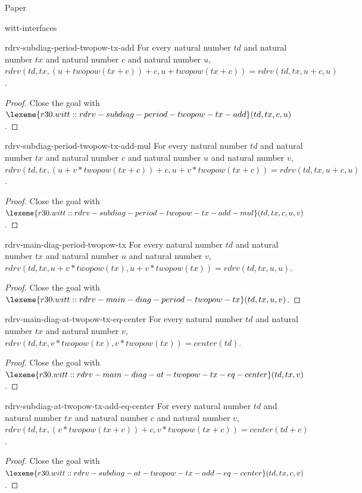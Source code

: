 \begin{lexlean}{Paper}
\begin{section}{witt-interfaces}
  \begin{theorem}{rdrv-subdiag-period-twopow-tx-add}
  For every natural number \(td\) and natural number \(tx\) and natural number \(c\) and natural number \(u\), \(rdrv(td, tx, (u + twopow(tx + c)) + c, u + twopow(tx + c)) = rdrv(td, tx, u + c, u)\).
  \begin{proof}
  Close the goal with \(\lexeme{r30.witt::rdrv-subdiag-period-twopow-tx-add}(td, tx, c, u)\).
  \end{proof}
  \end{theorem}

  \begin{theorem}{rdrv-subdiag-period-twopow-tx-add-mul}
  For every natural number \(td\) and natural number \(tx\) and natural number \(c\) and natural number \(u\) and natural number \(v\), \(rdrv(td, tx, (u + v * twopow(tx + c)) + c, u + v * twopow(tx + c)) = rdrv(td, tx, u + c, u)\).
  \begin{proof}
  Close the goal with \(\lexeme{r30.witt::rdrv-subdiag-period-twopow-tx-add-mul}(td, tx, c, u, v)\).
  \end{proof}
  \end{theorem}

  \begin{theorem}{rdrv-main-diag-period-twopow-tx}
  For every natural number \(td\) and natural number \(tx\) and natural number \(u\) and natural number \(v\), \(rdrv(td, tx, u + v * twopow(tx), u + v * twopow(tx)) = rdrv(td, tx, u, u)\).
  \begin{proof}
  Close the goal with \(\lexeme{r30.witt::rdrv-main-diag-period-twopow-tx}(td, tx, u, v)\).
  \end{proof}
  \end{theorem}

  \begin{theorem}{rdrv-main-diag-at-twopow-tx-eq-center}
  For every natural number \(td\) and natural number \(tx\) and natural number \(v\), \(rdrv(td, tx, v * twopow(tx), v * twopow(tx)) = center(td)\).
  \begin{proof}
  Close the goal with \(\lexeme{r30.witt::rdrv-main-diag-at-twopow-tx-eq-center}(td, tx, v)\).
  \end{proof}
  \end{theorem}

  \begin{theorem}{rdrv-subdiag-at-twopow-tx-add-eq-center}
  For every natural number \(td\) and natural number \(tx\) and natural number \(c\) and natural number \(v\), \(rdrv(td, tx, (v * twopow(tx + c)) + c, v * twopow(tx + c)) = center(td + c)\).
  \begin{proof}
  Close the goal with \(\lexeme{r30.witt::rdrv-subdiag-at-twopow-tx-add-eq-center}(td, tx, c, v)\).
  \end{proof}
  \end{theorem}


\end{section}
\end{lexlean}
